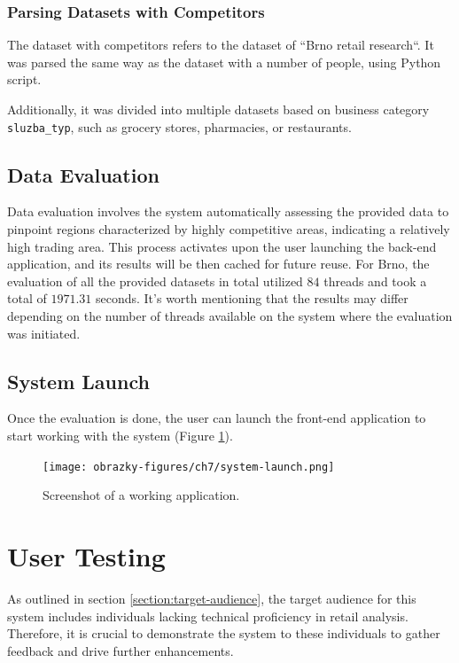 \subsubsection{Parsing Datasets with Competitors}

The dataset with competitors refers to the dataset of ``Brno retail research``. It was parsed the same way as the dataset with a number of people, using Python script. 

Additionally, it was divided into multiple datasets based on business category \texttt{sluzba\_typ}, such as grocery stores, pharmacies, or restaurants.

\subsection{Data Evaluation}

Data evaluation involves the system automatically assessing the provided data to pinpoint regions characterized by highly competitive areas, indicating a relatively high trading area. This process activates upon the user launching the back-end application, and its results will be then cached for future reuse. For Brno, the evaluation of all the provided datasets in total utilized $84$ threads and took a total of $1971.31$ seconds. It's worth mentioning that the results may differ depending on the number of threads available on the system where the evaluation was initiated.

\subsection{System Launch}

Once the evaluation is done, the user can launch the front-end application to start working with the system (Figure \ref{fig:workingApplication}).

\begin{figure}[ht]\centering
  \centering
  \texttt{[image: obrazky-figures/ch7/system-launch.png]}
  \caption{Screenshot of a working application.}
  \label{fig:workingApplication}
\end{figure}

\section{User Testing}

As outlined in section \ref{section:target-audience}, the target audience for this system includes individuals lacking technical proficiency in retail analysis. Therefore, it is crucial to demonstrate the system to these individuals to gather feedback and drive further enhancements.

